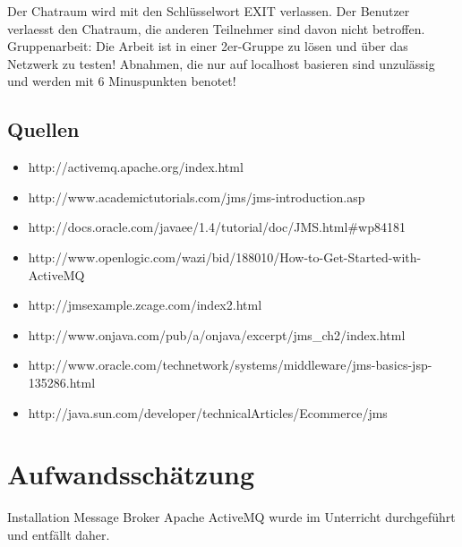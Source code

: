\documentclass[11pt, a4paper]{article}
\begin{document}
Der Chatraum wird mit den Schlüsselwort EXIT verlassen. Der Benutzer verlaesst den Chatraum, die anderen Teilnehmer sind davon nicht betroffen.
Gruppenarbeit: Die Arbeit ist in einer 2er-Gruppe zu lösen und über das Netzwerk zu testen! Abnahmen, die nur auf localhost basieren sind unzulässig und werden mit 6 Minuspunkten benotet!

\subsection{Quellen}
\begin{itemize}
\item http://activemq.apache.org/index.html
\item http://www.academictutorials.com/jms/jms-introduction.asp
\item http://docs.oracle.com/javaee/1.4/tutorial/doc/JMS.html\#wp84181
\item http://www.openlogic.com/wazi/bid/188010/How-to-Get-Started-with-ActiveMQ
\item http://jmsexample.zcage.com/index2.html
\item http://www.onjava.com/pub/a/onjava/excerpt/jms\_ch2/index.html
\item http://www.oracle.com/technetwork/systems/middleware/jms-basics-jsp-135286.html
\item http://java.sun.com/developer/technicalArticles/Ecommerce/jms
\end{itemize}

\newpage

\section{Aufwandsschätzung}
Installation Message Broker Apache ActiveMQ wurde im Unterricht durchgeführt und entfällt daher.
\end{document}
